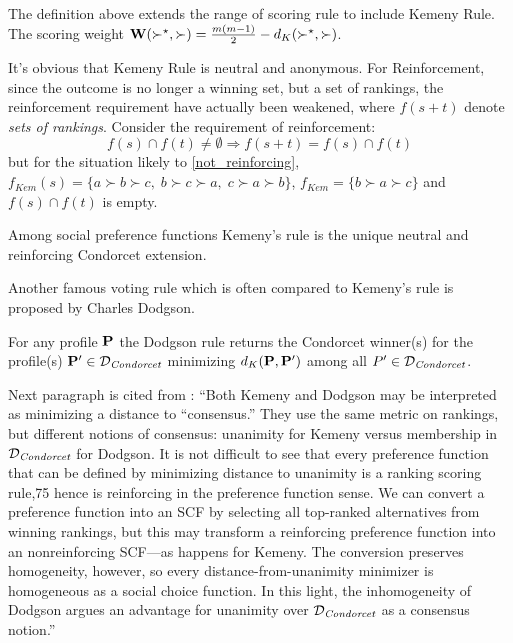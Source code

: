 The definition above extends the range of scoring rule to include Kemeny Rule. The scoring weight $\mathbf{W}(\succ^\star, \succ) = \frac{m(m-1)}{2} - d_K(\succ^\star,\succ)$.

It's obvious that Kemeny Rule is neutral and anonymous. For Reinforcement, since the outcome is no longer a winning set, but a set of rankings, the reinforcement requirement have actually been weakened, where $f(s+t)$ denote \emph{sets of rankings}. Consider the requirement of reinforcement:
$$
f(s) \cap f(t) \neq \emptyset \Rightarrow f(s+t) = f(s) \cap f(t)
$$
but for the situation likely to \cref{not_reinforcing}, $f_{\textit{Kem}}(s) = \{a \succ b \succ c,\; b \succ c \succ a,\; c \succ a \succ b\}$, $f_{\textit{Kem}} = \{b \succ a \succ c\}$ and $f(s) \cap f(t)$ is empty.

\begin{theorem}
    Among social preference functions Kemeny's rule is the unique neutral and reinforcing Condorcet extension.
\end{theorem}

Another famous voting rule which is often compared to Kemeny's rule is proposed by Charles Dodgson.

\begin{definition}
    For any profile $\mathbf{P}$ the Dodgson rule returns the Condorcet winner(s) for the profile(s) $\mathbf{P}' \in \mathcal{D}_\textit{Condorcet}$ minimizing $d_K (\mathbf{P},\mathbf{P}')$ among all $P' \in \mathcal{D}_\textit{Condorcet}$.
\end{definition}

Next paragraph is cited from \textcite{moulinHandbookComputationalSocial2016}:
``Both Kemeny and Dodgson may be interpreted as minimizing a distance to “consensus.” They use the same metric on rankings, but different notions of consensus: unanimity for Kemeny versus membership in $\mathcal{D}_\textit{Condorcet}$ for Dodgson. It is not difficult to see that every preference function that can be defined by minimizing distance to unanimity is a ranking scoring rule,75 hence is reinforcing in the preference function sense. We can convert a preference function into an SCF by selecting all top-ranked alternatives from winning rankings, but this may transform a reinforcing preference function into an nonreinforcing SCF—as happens for Kemeny. The conversion preserves homogeneity, however, so every distance-from-unanimity minimizer is homogeneous as a social choice function. In this light, the inhomogeneity of Dodgson argues an advantage for unanimity over $\mathcal{D}_\textit{Condorcet}$ as a consensus notion.''